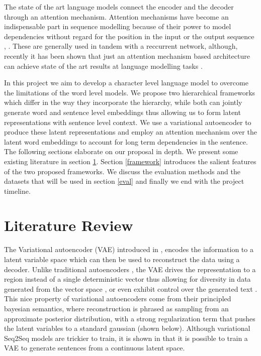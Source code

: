 \documentclass[journal, 12pt, draftcls, onecolumn]{IEEEtran}
\begin{document}
The state of the art language models connect the encoder and the decoder through an attention mechanism. Attention mechanisms have become an indispensable part in sequence modelling because of their power to model dependencies without regard for the position in the input or the output sequence \cite{C2}, \cite{C5}. These are generally used in tandem with a reccurrent network, although, recently it has been shown that just an attention mechanism based architecture can achieve state of the art results at language modelling tasks \cite{C6}.   

In this project we aim to develop a character level language model to overcome the limitations of the word level models. We propose two hierarchical frameworks which differ in the way they incorporate the hierarchy, while both can jointly generate word and sentence level embeddings thus allowing us to form latent representations with sentence level context. We use a variational autoencoder to produce these latent representations and employ an attention mechanism over the latent word embeddings to account for long term dependencies in the sentence. The following sections elaborate on our proposal in depth. We present some existing literature in section \ref{litr}. Section \ref{framework} introduces the salient features of the two proposed frameworks. We discuss the evaluation methods and the datasets that will be used in section \ref{eval} and finally we end with the project timeline.   

\section{Literature Review}\label{litr} 
The Variational autoencoder (VAE) introduced in \cite{C7}, encodes the information to a latent variable space which can then be used to reconstruct the data using a decoder. Unlike traditional autoencoders \cite{C9}, the VAE drives the representation to a region instead of a single deterministic vector thus allowing for diversity in data generated from the vector space \cite{C4}, or even exhibit control over the generated text \cite{C8}. This nice property of variational autoencoders come from their principled bayesian semantics, where reconstruction is phrased as sampling from an approximate posterior distribution, with a strong regularization term that pushes the latent variables to a standard gaussian (shown below). Although variational Seq2Seq models are trickier to train, it is shown in \cite{C4} that it is possible to train a VAE to generate sentences from a continuous latent space. 
\end{document}
